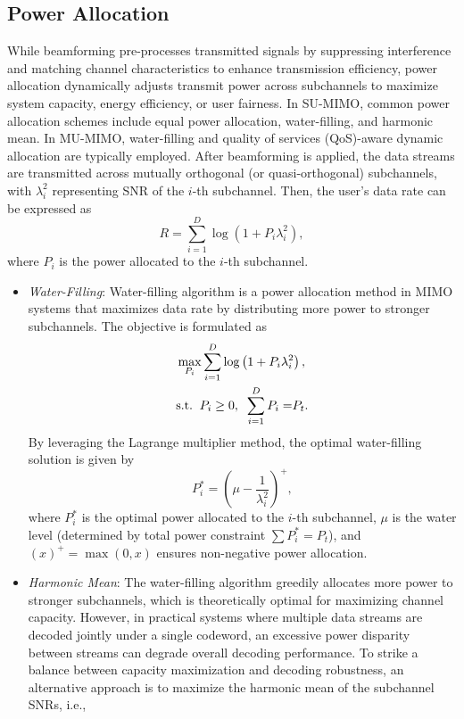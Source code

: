 \documentclass[lettersize,journal]{IEEEtran}
\begin{document}
\begin{appendices}
\subsection{Power Allocation}
While beamforming pre-processes transmitted signals by suppressing interference and matching channel characteristics to enhance transmission efficiency, power allocation dynamically adjusts transmit power across subchannels to maximize system capacity, energy efficiency, or user fairness.  In SU-MIMO, common power allocation schemes include equal power allocation, water-filling, and harmonic mean. In MU-MIMO, water-filling and quality of services (QoS)-aware dynamic allocation are typically employed. After beamforming is applied, the data streams are transmitted across mutually orthogonal (or quasi-orthogonal) subchannels, with \(\lambda_i^2\) representing SNR of the $i$-th subchannel. Then, the user's data rate can be expressed as
\begin{equation}
    R=\sum_{i=1}^{D} \log \left(1+P_i \lambda_i^2\right),
\end{equation}
where $P_i$ is the power allocated to the $i$-th subchannel.
\begin{itemize}
    \item \emph{Water-Filling}: Water-filling algorithm is a power allocation method in MIMO systems that maximizes data rate by distributing more power to stronger subchannels. The objective is formulated as
    \begin{equation}
     \begin{aligned}
&\mathop {\max }\limits_{{P_i}} \sum\limits_{i = 1}^D {\log } \left( {1 + {P_i}\lambda _i^2} \right),\\
&{\rm{s}}{\rm{.t}}{\rm{.}}\;\;{P_i} \ge 0,\;\;\sum\limits_{i = 1}^D {{P_i} =} {P_t}.
\end{aligned}   
    \end{equation}
By leveraging the Lagrange multiplier method, the optimal water-filling solution is given by  
\begin{equation}
P_i^* = \left( \mu - \frac{1}{\lambda_i^2} \right)^+,    
\end{equation}
where \( P_i^* \) is the optimal power allocated to the $i$-th subchannel,  \( \mu \) is the water level (determined by total power constraint \( \sum P_i^* = P_{t} \)), and \( (x)^+ = \max(0, x) \) ensures non-negative power allocation.  
 \item  \emph{Harmonic Mean}: The water-filling algorithm greedily allocates more power to stronger subchannels, which is theoretically optimal for maximizing channel capacity. However, in practical systems where multiple data streams are decoded jointly under a single codeword, an excessive power disparity between streams can degrade overall decoding performance. To strike a balance between capacity maximization and decoding robustness, an alternative approach is to maximize the harmonic mean of the subchannel SNRs, i.e., 

\end{itemize}
\end{appendices}
\end{document}

